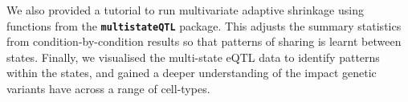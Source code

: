 \documentclass[
]{article}
\begin{document}
We also provided a tutorial to run multivariate adaptive shrinkage using
functions from the \textbf{\texttt{multistateQTL}} package. This adjusts
the summary statistics from condition-by-condition results so that
patterns of sharing is learnt between states. Finally, we visualised the
multi-state eQTL data to identify patterns within the states, and gained
a deeper understanding of the impact genetic variants have across a
range of cell-types.
\end{document}
